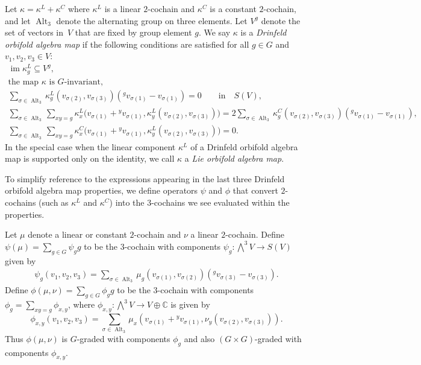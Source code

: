 \documentclass[10pt,a4paper]{amsart}
\numberwithin{equation}{section}
\newcommand{\actby}[1]{{}^{#1}}
\DeclareMathOperator{\Alt}{Alt}
\DeclareMathOperator{\im}{im}
\begin{document}
\begin{Definition}\label{def:fourconditions}
	Let $\kappa=\kappa^L+\kappa^C$ where $\kappa^L$ is a linear $2$-cochain and $\kappa^C$ is a constant $2$-cochain, and let $\Alt_3$ denote the alternating group on three elements. Let $V^g$ denote the set of vectors in~$V$ that are fixed by group element $g$.
	We say $\kappa$ is a {\it Drinfeld orbifold algebra map} if the following conditions are satisfied for all $g\in G$ and $v_1,v_2,v_3\in V$:
\begin{gather}
\label{PBWconditions-0}
\im\kappa^L_g\subseteq V^g,
\\
\label{PBWconditions-i}
\text{the map $\kappa$ is $G$-invariant,}
\\
\label{PBWconditions-ii} \sum_{\sigma\in\Alt_3}\kappa^L_g(v_{\sigma(2)},v_{\sigma(3)})(\actby{g}v_{\sigma(1)}-v_{\sigma(1)})=0\qquad
\text{in}\quad S(V),
\\
\label{PBWconditions-iii}
\sum_{\sigma\in\Alt_3}\sum_{xy=g}
\kappa^L_x\big(v_{\sigma(1)}+\actby{y}v_{\sigma(1)},\kappa^L_y(v_{\sigma(2)},v_{\sigma(3)})\big) =2\!\!\sum_{\sigma\in\Alt_3}\!\kappa^C_g(v_{\sigma(2)},v_{\sigma(3)})(\actby{g}v_{\sigma(1)}-v_{\sigma(1)}),
\\
\label{PBWconditions-iv}
\sum_{\sigma\in\Alt_3}\sum_{xy=g}
\kappa^C_x\big(v_{\sigma(1)}+\actby{y}v_{\sigma(1)},\kappa^L_y(v_{\sigma(2)},v_{\sigma(3)})\big)=0.
\end{gather}
In the special case when the linear component $\kappa^L$ of	a Drinfeld orbifold
algebra map is supported only on the identity, we call $\kappa$ a {\it Lie orbifold algebra map}.
\end{Definition}

To simplify reference to the expressions appearing in the last three Drinfeld orbifold algebra map properties, we define operators $\psi$ and $\phi$ that convert $2$-cochains (such as $\kappa^L$ and $\kappa^C$) into the $3$-cochains we see evaluated within the properties.

\begin{Definition}%
	Let $\mu$ denote a linear or constant $2$-cochain and $\nu$ a linear $2$-cochain.
	Define $\psi(\mu)=\sum_{g\in G}\psi_gg$ to be the $3$-cochain with components $\psi_g\colon \bigwedge^3V\rightarrow S(V)$ given by
	\begin{gather*}
\psi_g(v_1,v_2,v_3)=\sum_{\sigma\in\Alt_3}\mu_g(v_{\sigma(1)},v_{\sigma(2)})(\actby{g}v_{\sigma(3)}-v_{\sigma(3)}).
	\end{gather*}
	Define $\phi(\mu,\nu)=\sum_{g\in G}\phi_g g$ to be the $3$-cochain
	with components $\phi_g=\sum_{xy=g}\phi_{x,y}$, where $\phi_{x,y}\colon \bigwedge^3 V\to V\oplus\mathbb{C}$ is given by
	\begin{equation}
	\label{phi}
	\phi_{x,y}(v_1,v_2,v_3)=\sum_{\sigma\in\Alt_3}\mu_x(v_{\sigma(1)}+\actby{y}v_{\sigma(1)},\nu_y(v_{\sigma(2)},v_{\sigma(3)})).
	\end{equation}
	Thus $\phi(\mu,\nu)$ is $G$-graded with components $\phi_g$ and also $(G\times G)$-graded with components $\phi_{x,y}$.
\end{Definition}
\end{document}
